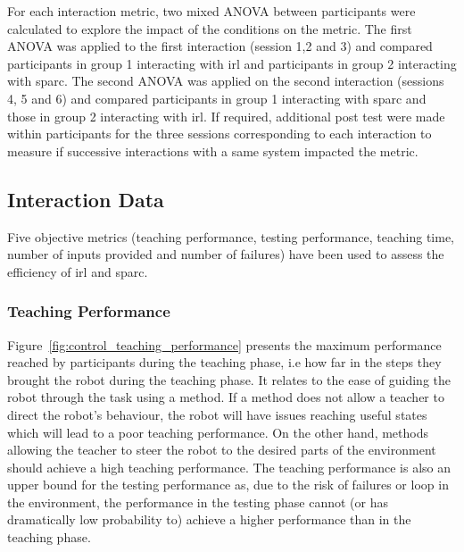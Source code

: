 For each interaction metric, two mixed ANOVA between participants were calculated to explore the impact of the conditions on the metric. The first ANOVA was applied to the first interaction (session 1,2 and 3) and compared participants in group 1 interacting with \gls{irl} and participants in group 2 interacting with \gls{sparc}. The second ANOVA was applied on the second interaction (sessions 4, 5 and 6) and compared participants in group 1 interacting with \gls{sparc} and those in group 2 interacting with \gls{irl}. If required, additional post test were made within participants for the three sessions corresponding to each interaction to measure if successive interactions with a same system impacted the metric.



\subsection{Interaction Data}

Five objective metrics (teaching performance, testing performance, teaching time, number of inputs provided and number of failures) have been used to assess the efficiency of \gls{irl} and \gls{sparc}. 

\subsubsection{Teaching Performance}

Figure~\ref{fig:control_teaching_performance} presents the maximum performance reached by participants during the teaching phase, i.e how far in the steps they brought the robot during the teaching phase. It relates to the ease of guiding the robot through the task using a method. If a method does not allow a teacher to direct the robot's behaviour, the robot will have issues reaching useful states which will lead to a poor teaching performance. On the other hand, methods allowing the teacher to steer the robot to the desired parts of the environment should achieve a high teaching performance. The teaching performance is also an upper bound for the testing performance as, due to the risk of failures or loop in the environment, the performance in the testing phase cannot (or has dramatically low probability to) achieve a higher performance than in the teaching phase.

